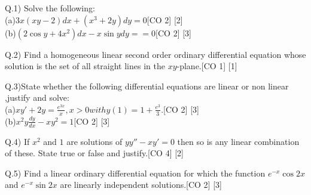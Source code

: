 \documentclass[12pt]{article}
\begin{document}
	
	\newpage
	\begin{flushleft}
		Q.1) Solve the following:\\[10pt]
		(a)$3x(xy-2)dx+(x^3+2y)dy=0$\hspace{5.5cm}[CO 2] [2]\\[6 pt]
		(b)$(2\cos{y} + 4x^2)dx -x\sin{y}dy==0$\hspace{5.09cm}[CO 2]    [3]\\
	\end{flushleft}
	
	
	
	\begin{flushleft}
		Q.2) Find a homogeneous linear second order ordinary differential equation whose solution is the set of all straight lines in the $xy$-plane.\hspace{0.9cm}[CO 1] [1]\\
	\end{flushleft}
	
	\begin{flushleft}
		Q.3)State whether the following differential equations are linear or non linear ,justify and solve:\\[10pt]
		(a)$xy'+2y = \frac{e^{3x}}{x}, x>0 with y(1)=1+\frac{e^3}{3}. $\hspace{4.2cm}[CO 2] [3]\\[6 pt]
		(b)$x^2y\frac{dy}{dx}- xy^2 = 1$\hspace{8.3cm}[CO 2] [3]
	\end{flushleft}
	
	\begin{flushleft}
		Q.4) If $x^2$ and $1$ are solutions of $yy''-xy'=0$ then so is any linear combination of these. State true or false and justify.\hspace{2.3cm}[CO 4] [2]
	\end{flushleft}
	
	\begin{flushleft}
		Q.5) Find a linear ordinary differential equation for which the function $e^{-x}\cos{2x}$ and $e^{-x}\sin{2x}$ are linearly independent solutions.\hspace{1cm}[CO 2] [3]
	\end{flushleft}
	
\end{document}
